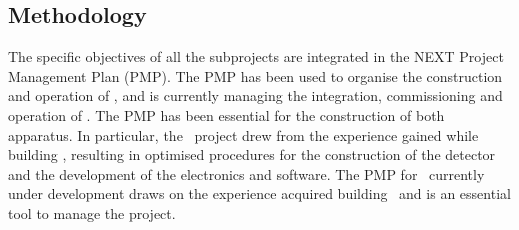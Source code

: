 \subsection{Methodology}



The specific objectives of all the subprojects are integrated in the NEXT Project Management Plan (PMP). The PMP has been used to organise the construction and operation of \NEW, and is currently managing the integration, commissioning and operation of \Next. 
The PMP has been essential for the construction of both apparatus. In particular, the \Next\  project drew from the experience gained while building \NEW, resulting in optimised procedures for the construction of the detector and the development of the electronics and software. The PMP for \NHD\ currently under development draws on the experience acquired building \Next\ and is an essential tool to manage the project.  
\indent




